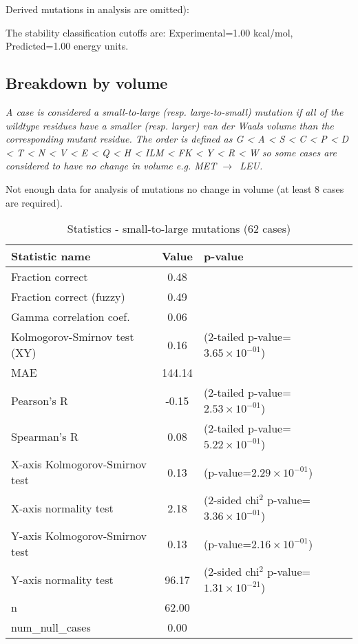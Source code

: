 \documentclass[10pt, letterpaper, oneside, titlepage, landscape]{scrreprt}
\begin{document}
Derived mutations in analysis are omitted):

The stability classification cutoffs are: Experimental=1.00 kcal/mol, Predicted=1.00 energy units.
\subsection{Breakdown by volume}
\textit{A case is considered a small-to-large (resp. large-to-small) mutation if all of the wildtype residues have a smaller (resp. larger) van der Waals volume than the corresponding mutant residue. The order is defined as G < A < S < C < P < D < T < N < V < E < Q < H < ILM < FK < Y < R < W so some cases are considered to have no change in volume e.g. MET $\rightarrow$\ LEU.}

Not enough data for analysis of mutations no change in volume (at least 8 cases are required).


\begin{table}[H]\begin{center}
\begin{tabular}{ l S[table-format=3.2] l}
Statistic name & {Value} & p-value\\
\hline
Fraction correct & 0.48 & \\
Fraction correct (fuzzy) & 0.49 & \\
Gamma correlation coef. & 0.06 & \\
Kolmogorov-Smirnov test (XY) & 0.16 & (2-tailed p-value=$3.65\times10^{-01}$)\\
MAE & 144.14 & \\
Pearson's R & -0.15 & (2-tailed p-value=$2.53\times10^{-01}$)\\
Spearman's R & 0.08 & (2-tailed p-value=$5.22\times10^{-01}$)\\
X-axis Kolmogorov-Smirnov test & 0.13 & (p-value=$2.29\times10^{-01}$)\\
X-axis normality test & 2.18 & (2-sided chi$^{2}$ p-value=$3.36\times10^{-01}$)\\
Y-axis Kolmogorov-Smirnov test & 0.13 & (p-value=$2.16\times10^{-01}$)\\
Y-axis normality test & 96.17 & (2-sided chi$^{2}$ p-value=$1.31\times10^{-21}$)\\
n & 62.00 & \\
num\_null\_cases & 0.00 & \\
\end{tabular}
\caption{Statistics - small-to-large mutations (62 cases)}
\end{center}\end{table}
\end{document}
